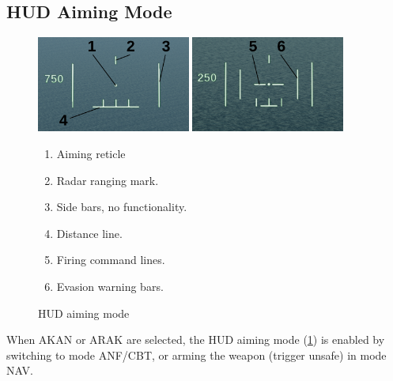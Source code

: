 \subsection{HUD Aiming Mode}
\begin{figure}[!ht]
  \centering
  \includegraphics[width=0.45\textwidth]{images/displays/ajs-hud-aiming1.png}
  \includegraphics[width=0.45\textwidth]{images/displays/ajs-hud-aiming2.png}

  \begin{multicols}{2}
    \begin{enumerate}[nosep]
      \item \label{item:reticle} Aiming reticle
      \item \label{item:rdr-range} Radar ranging mark.
      \item Side bars, no functionality.
      \item \label{item:distline} Distance line.
      \item \label{item:fire-mark} Firing command lines.
      \item \label{item:pullup-bars} Evasion warning bars.
    \end{enumerate}
  \end{multicols}
  \caption{HUD aiming mode}
  \label{fig:hud-aiming}
\end{figure}

When AKAN or ARAK are selected, the HUD aiming mode (\cref{fig:hud-aiming})
is enabled by switching to mode ANF/CBT, or arming the weapon (trigger unsafe) in mode NAV.

